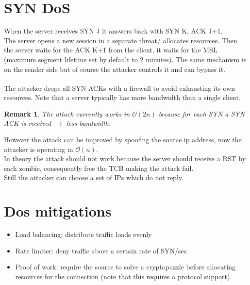 \documentclass[10pt,a4paper]{book}
\newtheorem{remark}{Remark}
\begin{document}
\section{SYN DoS}
When the server receives SYN J it answers back with SYN K, ACK J+1.\\
The server opens a new session in a separate threat/ allocates resources. Then the server waits for the ACK K+1 from the client, it waits for the MSL (maximum segment lifetime set by default to 2 minutes). The same mechanism is on the sender side but of course the attacker controls it and can bypass it.\\\\
The attacker drops all SYN ACKs with a firewall to avoid exhausting its own resources. Note that a server typically has more bandwidth than a single client.
\begin{remark}
The attack currently works in $\mathcal{O}(2n)$ because for each SYN a SYN ACK is received $\to$ less bandwidth.
\end{remark}
However the attack can be improved by spoofing the source ip address, now the attacker is operating in $\mathcal{O}(n)$.\\
In theory the attack should not work because the server should receive a RST by each zombie, consequently free the TCB making the attack fail.\\
Still the attacker can choose a set of IPs which do not reply.
\section{Dos mitigations}
\begin{itemize}
\item Load balancing: distribute traffic loads evenly
\item Rate limiter: deny traffic above a certain rate of SYN/sec
\item Proof of work: require the source to solve a cryptopuzzle before allocating resources for the connection (note that this requires a protocol support).
\end{itemize}
\newpage
\end{document}
